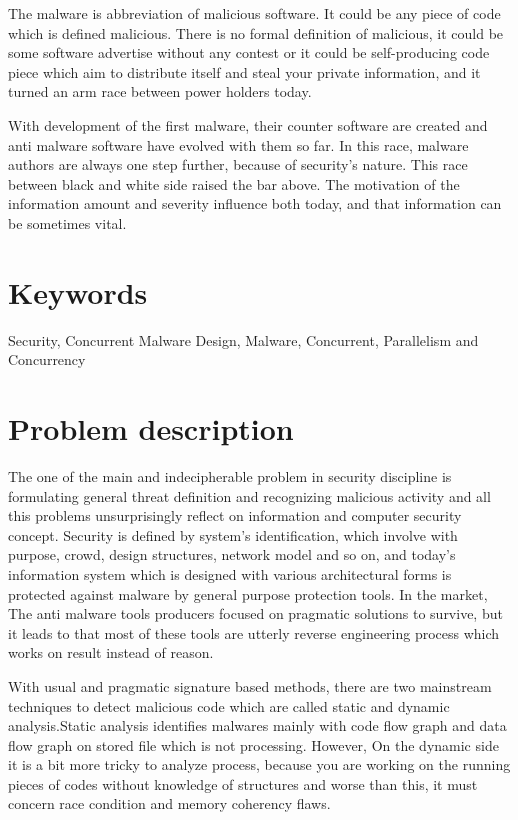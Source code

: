 The malware is abbreviation of malicious software. It could be any piece of code which is defined malicious. There is no formal definition of malicious, it could be some software advertise without any contest or it could be self-producing code piece which aim to distribute itself and steal your private information, and it turned an arm race between power holders today.

With development of the first malware, their counter software are created and anti malware software have evolved with them so far. In this race, malware authors are always one step further, because of security's nature. This race between black and white side raised the bar above. The motivation of the information amount and severity influence both today, and that information can be sometimes vital. 


\section{Keywords}
Security, Concurrent Malware Design, Malware, Concurrent, Parallelism and Concurrency

\section{Problem description}
The one of the main and indecipherable problem in security discipline is formulating general threat definition and recognizing malicious activity and all this problems unsurprisingly reflect on information and computer security concept. Security is defined by system’s identification, which involve with purpose, crowd, design structures, network model and so on, and today’s information system which is designed with various architectural forms is protected against malware by general purpose protection tools. In the market, The anti malware tools producers focused on pragmatic solutions to survive, but it leads to that most of these tools are utterly reverse engineering process which works on result instead of reason.

With usual and pragmatic signature based methods, there are two mainstream techniques to detect malicious code which are called static and dynamic analysis.Static analysis identifies malwares mainly with code flow graph and data flow graph on stored file which is not processing. However, On the dynamic side it is a bit more tricky to analyze process, because you are working on the running pieces of codes without knowledge of structures and worse than this, it must concern race condition and memory coherency flaws.

